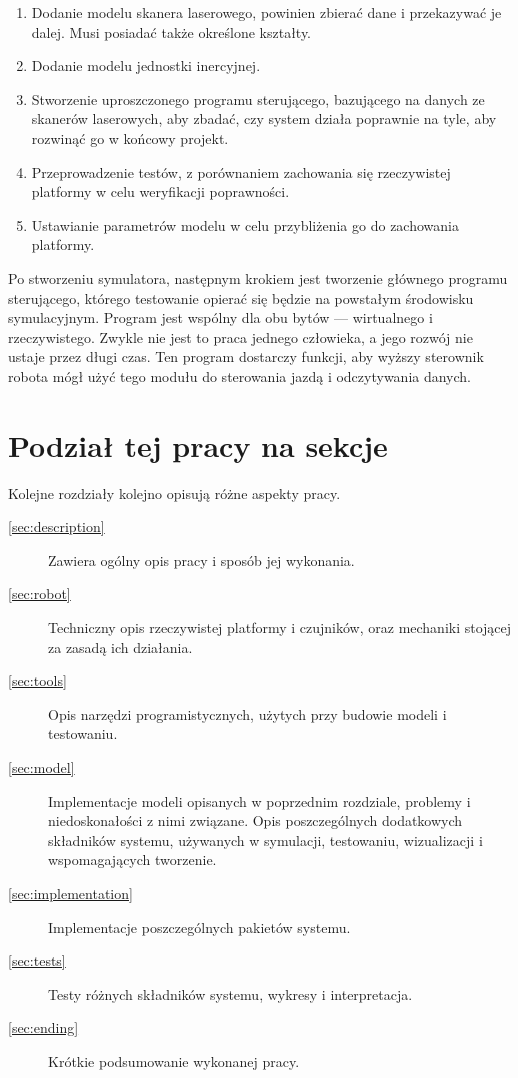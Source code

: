 \begin{enumerate}
	\item Dodanie modelu skanera laserowego, powinien zbierać dane i przekazywać je dalej. Musi posiadać także określone kształty.
	\item Dodanie modelu jednostki inercyjnej.
	\item Stworzenie uproszczonego programu sterującego, bazującego na danych ze skanerów laserowych, aby zbadać, czy system działa poprawnie na tyle, aby rozwinąć go w końcowy projekt.
	\item Przeprowadzenie testów, z porównaniem zachowania się rzeczywistej platformy w celu weryfikacji poprawności.
	\item Ustawianie parametrów modelu w celu przybliżenia go do zachowania platformy.
	\end{enumerate}
	
	Po stworzeniu symulatora, następnym krokiem jest tworzenie głównego programu sterującego, którego testowanie opierać się będzie na powstałym środowisku symulacyjnym.
	Program jest wspólny dla obu bytów --- wirtualnego i rzeczywistego.
	Zwykle nie jest to praca jednego człowieka, a jego rozwój nie ustaje przez długi czas.
	Ten program dostarczy funkcji, aby wyższy sterownik robota mógł użyć tego modułu do sterowania jazdą i odczytywania danych.
	

\section{Podział tej pracy na sekcje}
	Kolejne rozdziały kolejno opisują różne aspekty pracy.
	\begin{description}
		\item[\ref{sec:description}] Zawiera ogólny opis pracy i sposób jej wykonania.
		\item[\ref{sec:robot}] Techniczny opis rzeczywistej platformy i czujników, oraz mechaniki stojącej za zasadą ich działania.
		\item[\ref{sec:tools}] Opis narzędzi programistycznych, użytych przy budowie modeli i testowaniu.
		\item[\ref{sec:model}] Implementacje modeli opisanych w poprzednim rozdziale, problemy i niedoskonałości z nimi związane. Opis poszczególnych dodatkowych składników systemu, używanych w symulacji, testowaniu, wizualizacji i wspomagających tworzenie.
		\item[\ref{sec:implementation}] Implementacje poszczególnych pakietów systemu.
		\item[\ref{sec:tests}] Testy różnych składników systemu, wykresy i interpretacja.
		\item[\ref{sec:ending}] Krótkie podsumowanie wykonanej pracy.
	\end{description}

